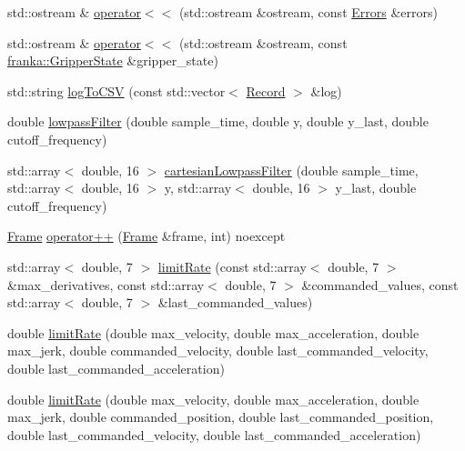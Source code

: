 \begin{DoxyCompactItemize}
\item 
std\+::ostream \& \hyperlink{namespacefranka_ae9f750600d2c25ecd32c0d4d15ee310e}{operator$<$$<$} (std\+::ostream \&ostream, const \hyperlink{structfranka_1_1Errors}{Errors} \&errors)
\item 
std\+::ostream \& \hyperlink{namespacefranka_a1ef4ce6566d9f9bcaf49cf93f6f608af}{operator$<$$<$} (std\+::ostream \&ostream, const \hyperlink{structfranka_1_1GripperState}{franka\+::\+Gripper\+State} \&gripper\+\_\+state)
\item 
std\+::string \hyperlink{namespacefranka_a01fbdb37b0e6beb04ba108d5f5024fd9}{log\+To\+C\+SV} (const std\+::vector$<$ \hyperlink{structfranka_1_1Record}{Record} $>$ \&log)
\item 
double \hyperlink{namespacefranka_a94c21b0e87afce0147a9cd6025c239ca}{lowpass\+Filter} (double sample\+\_\+time, double y, double y\+\_\+last, double cutoff\+\_\+frequency)
\item 
std\+::array$<$ double, 16 $>$ \hyperlink{namespacefranka_a7c9b0bec78181cabee7466bc136996e6}{cartesian\+Lowpass\+Filter} (double sample\+\_\+time, std\+::array$<$ double, 16 $>$ y, std\+::array$<$ double, 16 $>$ y\+\_\+last, double cutoff\+\_\+frequency)
\item 
\hyperlink{namespacefranka_a00b729ddce916481d3f0d10febec4f5b}{Frame} \hyperlink{namespacefranka_ae39c3a098fdb1bc9a097a262312454d0}{operator++} (\hyperlink{namespacefranka_a00b729ddce916481d3f0d10febec4f5b}{Frame} \&frame, int) noexcept
\item 
std\+::array$<$ double, 7 $>$ \hyperlink{namespacefranka_a77e127a920da5b0ad29877ec3ff29f15}{limit\+Rate} (const std\+::array$<$ double, 7 $>$ \&max\+\_\+derivatives, const std\+::array$<$ double, 7 $>$ \&commanded\+\_\+values, const std\+::array$<$ double, 7 $>$ \&last\+\_\+commanded\+\_\+values)
\item 
double \hyperlink{namespacefranka_a6953f5b41a9fd77389b92b82cf378056}{limit\+Rate} (double max\+\_\+velocity, double max\+\_\+acceleration, double max\+\_\+jerk, double commanded\+\_\+velocity, double last\+\_\+commanded\+\_\+velocity, double last\+\_\+commanded\+\_\+acceleration)
\item 
double \hyperlink{namespacefranka_a795142512ca54c220b2f2d52e239e35d}{limit\+Rate} (double max\+\_\+velocity, double max\+\_\+acceleration, double max\+\_\+jerk, double commanded\+\_\+position, double last\+\_\+commanded\+\_\+position, double last\+\_\+commanded\+\_\+velocity, double last\+\_\+commanded\+\_\+acceleration)
\item 

\end{DoxyCompactItemize}
